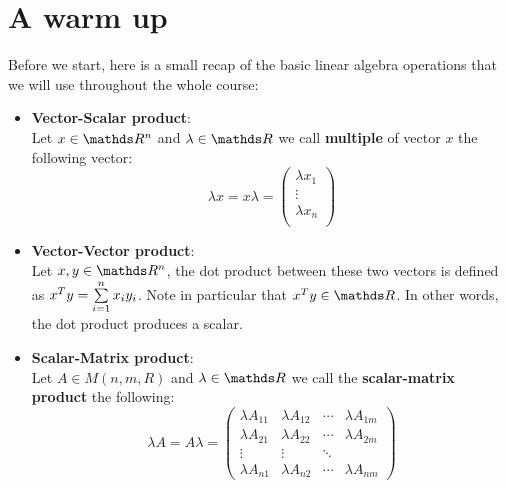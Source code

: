 \documentclass[computationalMathematics.tex]{subfiles}
\begin{document}
\section{A warm up}
Before we start, here is a small recap of the basic linear algebra operations that we will use throughout the whole course:
\begin{itemize}
    \item \textbf{Vector-Scalar product}:\\
      Let $x \in \R^n$ and $\lambda \in \R$ we call \textbf{multiple} of vector $x$ the following vector:
      \[
        \lambda x = x \lambda =
        \begin{pmatrix}
        \lambda x_1\\
        \vdots\\
        \lambda x_n\\
      \end{pmatrix}
      \]
    
    \item \textbf{Vector-Vector product}:\\
      Let $x, y \in \R^n$, the dot product between these two vectors is defined as ${x}^{T} y = \sum\limits_{i=1}^n x_i y_i$. Note in particular that $\tr{x}y \in \R$. In other words, the dot product produces a scalar.
     
     \item \textbf{Scalar-Matrix product}:\\
      Let $A \in M(n, m, R)$ and $\lambda \in \R$ we call the \textbf{scalar-matrix product} the following:
      \[
        \lambda A = A \lambda = 
        \begin{pmatrix}
        \lambda A_{11} & \lambda A_{12} & \cdots & \lambda A_{1m}\\
        \lambda A_{21} & \lambda A_{22} & \cdots & \lambda A_{2m}\\
        \vdots  &\vdots & \ddots\\
        \lambda A_{n1} & \lambda A_{n2} & \cdots & \lambda A_{nm}
        \end{pmatrix}
      \]
     

\end{itemize}
\end{document}
